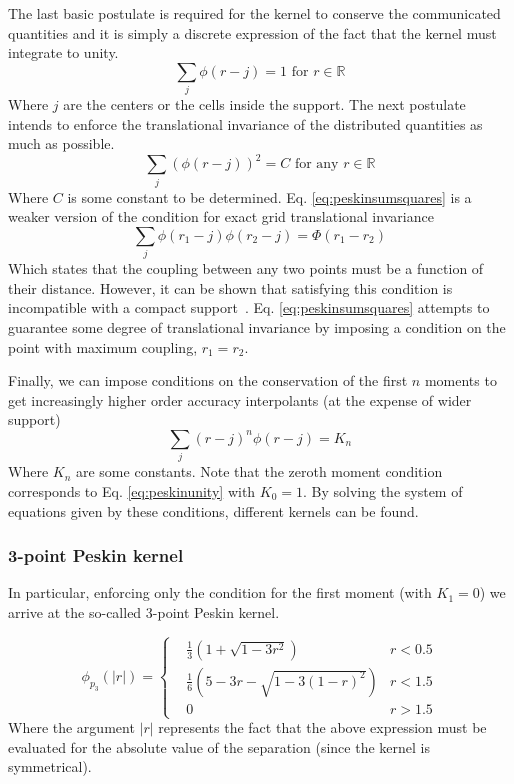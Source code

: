 \documentclass[ twoside,openright,titlepage,numbers=noenddot,%
headinclude,footinclude,cleardoublepage=empty,abstract=on,
BCOR=5mm,paper=b5,fontsize=11pt, dvipsnames
]{scrreprt}
\begin{document}
The last basic postulate is required for the kernel to conserve the communicated quantities and it is simply a discrete expression of the fact that the kernel must integrate to unity.
\begin{equation}
  \label{eq:peskinunity}
  \sum_j \phi(r-j) = 1 \textrm{ for } r\in\mathbb R
\end{equation}
Where $j$ are the centers or the cells inside the support.
The next postulate intends to enforce the translational invariance of the distributed quantities as much as possible.
\begin{equation}
  \label{eq:peskinsumsquares}
  \sum_j\left(\phi(r-j)\right)^2 = C \textrm{ for any } r\in\mathbb R
\end{equation}
Where $C$ is some constant to be determined. Eq. \eqref{eq:peskinsumsquares} is a weaker version of the condition for exact grid translational invariance
\begin{equation}
  \sum_j\phi(r_1-j)\phi(r_2-j) = \Phi(r_1-r_2)
\end{equation}
Which states that the coupling between any two points must be a function of their distance. However, it can be shown that satisfying this condition is incompatible with a compact support~\cite{Peskin2002}. Eq. \eqref{eq:peskinsumsquares} attempts to guarantee some degree of translational invariance by imposing a condition on the point with maximum coupling, $r_1 = r_2$.

Finally, we can impose conditions on the conservation of the first $n$ moments to get increasingly higher order accuracy interpolants (at the expense of wider support)
\begin{equation}
  \sum_j(r-j)^n\phi(r-j) = K_n
\end{equation}
Where $K_n$ are some constants. Note that the zeroth moment condition corresponds to Eq. \eqref{eq:peskinunity} with $K_0 = 1$.
By solving the system of equations given by these conditions, different kernels can be found. 

\subsubsection*{3-point Peskin kernel}
In particular, enforcing only the condition for the first moment (with $K_1=0$) we arrive at the so-called 3-point Peskin kernel.

\begin{equation}
  \label{eq:peskin3}
  \phi_{p_3}(|r|) =  \left\{
  \begin{aligned}
    & \frac{1}{3}\left( 1 + \sqrt{1-3r^2}\right)& r < 0.5\\
    & \frac{1}{6}\left(5-3r-\sqrt{1-3(1-r)^2}\right)& r < 1.5\\
    & 0 & r>1.5 
  \end{aligned}\right.
\end{equation}
Where the argument $|r|$ represents the fact that the above expression must be evaluated for the absolute value of the separation (since the kernel is symmetrical).
\end{document}
